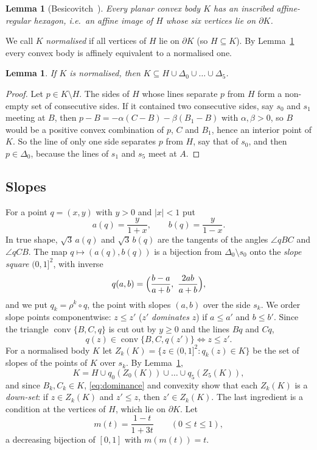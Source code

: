 \documentclass[11pt]{amsart}
\newtheorem{lemma}[theorem]{Lemma}
\theoremstyle{definition}
\theoremstyle{remark}
\DeclareMathOperator{\conv}{conv}
\begin{document}
\begin{lemma}[Besicovitch~\cite{Besicovitch}]\label{lem:besicovitch}
Every planar convex body $K$ has an inscribed affine-regular hexagon, i.e.\ an affine image of $H$ whose six vertices lie
on $\partial K$.
\end{lemma}

We call $K$ \emph{normalised} if all vertices of $H$ lie on $\partial K$ (so $H\subseteq K$). By
Lemma~\ref{lem:besicovitch} every convex body is affinely equivalent to a normalised one.

\begin{lemma}\label{lem:hexagram}
If $K$ is normalised, then $K\subseteq H\cup\Delta_0\cup\dots\cup\Delta_5$.
\end{lemma}

\begin{proof}
Let $p\in K\setminus H$. The sides of $H$ whose lines separate $p$ from $H$ form a non-empty set of consecutive sides. If
it contained two consecutive sides, say $s_0$ and $s_1$ meeting at $B$, then $p-B=-\alpha(C-B)-\beta(B_1-B)$ with
$\alpha,\beta>0$, so $B$ would be a positive convex combination of $p$, $C$ and $B_1$, hence an interior point of $K$. So
the line of only one side separates $p$ from $H$, say that of $s_0$, and then $p\in\Delta_0$, because the lines of $s_1$
and $s_5$ meet at $A$.
\end{proof}

\subsection{Slopes}
For a point $q=(x,y)$ with $y>0$ and $|x|<1$ put
\[
  a(q)=\frac{y}{1+x},\qquad b(q)=\frac{y}{1-x}.
\]
In true shape, $\sqrt3\,a(q)$ and $\sqrt3\,b(q)$ are the tangents of the angles $\angle qBC$ and $\angle qCB$. The
map $q\mapsto(a(q),b(q))$ is a bijection from $\Delta_0\setminus s_0$ onto the \emph{slope square} $(0,1]^2$, with inverse
\[
  q(a,b)=\Bigl(\frac{b-a}{a+b},\ \frac{2ab}{a+b}\Bigr),
\]
and we put $q_k=\rho^k\circ q$, the point with slopes $(a,b)$ over the side $s_k$. We order slope points componentwise:
$z\le z'$ ($z'$ \emph{dominates} $z$) if $a\le a'$ and $b\le b'$. Since the triangle $\conv\{B,C,q\}$ is cut out by
$y\ge0$ and the lines $Bq$ and $Cq$,
\begin{equation}\label{eq:dominance}
  q(z)\in\conv\{B,C,q(z')\}\iff z\le z' .
\end{equation}
For a normalised body $K$ let $Z_k(K)=\{z\in(0,1]^2: q_k(z)\in K\}$ be the set of slopes of the points of $K$ over $s_k$.
By Lemma~\ref{lem:hexagram},
\begin{equation}\label{eq:profile}
  K=H\cup q_0(Z_0(K))\cup\dots\cup q_5(Z_5(K)),
\end{equation}
and since $B_k,C_k\in K$, \eqref{eq:dominance} and convexity show that each $Z_k(K)$ is a \emph{down-set}: if $z\in Z_k(K)$
and $z'\le z$, then $z'\in Z_k(K)$. The last ingredient is a condition at the vertices of $H$, which lie on $\partial K$.
Let
\[
  m(t)=\frac{1-t}{1+3t}\qquad(0\le t\le1),
\]
a decreasing bijection of $[0,1]$ with $m(m(t))=t$.
\end{document}
